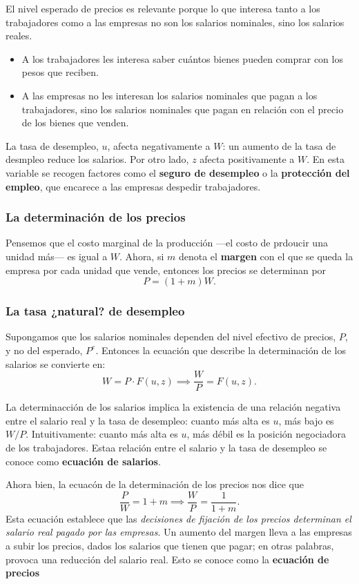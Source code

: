 \documentclass[10pt]{article}
\begin{document}
\begin{multicols*}{2}
El nivel esperado de precios es relevante porque lo que interesa tanto a los trabajadores como a las empresas no son los salarios nominales, sino los salarios reales.
\begin{itemize}
    \item A los trabajadores les interesa saber cuántos bienes pueden comprar con los pesos que reciben.
    \item A las empresas no les interesan los salarios nominales que pagan a los trabajadores, sino los salarios nominales que pagan en relación con el precio de los bienes que venden.
\end{itemize}

La tasa de desempleo, $u$, afecta negativamente a $W$: un aumento de la tasa de desmpleo reduce los salarios. Por otro lado, $z$ afecta positivamente a $W$. En esta variable se recogen factores como el \textbf{seguro de desempleo} o la \textbf{protección del empleo}, que encarece a las empresas despedir trabajadores.

\subsubsection{La determinación de los precios}
Pensemos que el costo marginal de la producción ---el costo de prdoucir una unidad más--- es igual a $W$. Ahora, si $m$ denota el \textbf{margen} con el que se queda la empresa por cada unidad que vende, entonces los precios se determinan por
\[ P = (1+m)W. \]

\subsubsection{La tasa ¿natural? de desempleo}
Supongamos que los salarios nominales dependen del nivel efectivo de precios, $P$, y no del esperado, $P^e$. Entonces la ecuación que describe la determinación de los salarios se convierte en:
\[ W = P \cdot F(u,z) \implies \frac{W}{P} = F(u,z). \]

La determinacción de los salarios implica la existencia de una relación negativa entre el salario real y la tasa de desempleo: cuanto más alta es $u$, más bajo es $W/P$. Intuitivamente: cuanto más alta es $u$, más débil es la posición negociadora de los trabajadores. Estaa relación entre el salario y la tasa de desempleo se conoce como \textbf{ecuación de salarios}.

Ahora bien, la ecuacón de la determinación de los precios nos dice que
\[ \frac{P}{W} = 1 + m \implies \frac{W}{P} = \frac{1}{1+m}. \]
Esta ecuación establece que las \textit{decisiones de fijación de los precios determinan el salario real pagado por las empresas}. Un aumento del margen lleva a las empresas a subir los precios, dados los salarios que tienen que pagar; en otras palabras, provoca una reducción del salario real. Esto se conoce como la \textbf{ecuación de precios}


\end{multicols*}
\end{document}

